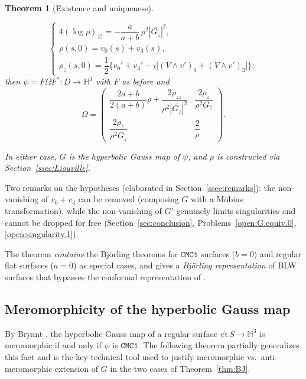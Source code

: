 \documentclass[11pt,a4paper]{article}
\newcommand{\Hyp}{\mathbb{H}^3}                      %
\theoremstyle{plain}
\newtheorem{theorem}{Theorem}
\theoremstyle{definition}
\theoremstyle{remark}
\begin{document}
\begin{theorem}[Existence and uniqueness]
\begin{description}
\begin{equation}
    \begin{cases}
      4(\log\rho)_{z\bar z} = -\dfrac a{a+b}\,\rho^2|\overline{G_z}|^2,\\[1mm]
      \rho(s,0) = v_0(s)+v_3(s),\\[1mm]
      \rho_z(s,0) = \dfrac12\Big\{v_0'+v_3'
        - i\big[(V\wedge v')_0+(V\wedge v')_3\big]\Big\};
    \end{cases}
  \end{equation}
  then $\psi=F\Omega F^*:D\to\Hyp$ with $F$ as before and
  \begin{equation}\label{eq:FOmega2}
    \Omega = \begin{pmatrix}
      \dfrac{2a+b}{2(a+b)}\rho + \dfrac{2\rho_{z\bar z}}{\rho^2|\overline{G_z}|^2}
        & \dfrac{2\rho_{\bar z}}{\rho^2 G_{\bar z}}\\[3mm]
      \dfrac{2\rho_z}{\rho^2\overline{G_z}} & \dfrac2\rho
    \end{pmatrix}.
  \end{equation}
\end{description}
In either case, $G$ is the hyperbolic Gauss map of $\psi$, and $\rho$ is
constructed via Section~\ref{ssec:Liouville}.
\end{theorem}

Two remarks on the hypotheses (elaborated in Section~\ref{ssec:remarks}):
the non-vanishing of $v_0+v_3$ can be removed (composing $G$ with a
Möbius transformation), while the non-vanishing of $G'$ genuinely limits
singularities and cannot be dropped for free (Section~\ref{sec:conclusion},
Problems~\ref{open:G.equiv.0}, \ref{open:singularity.1}).

The theorem \emph{contains} the Björling theorems for $\mathtt{CMC1}$
surfaces \cite{GMM1} ($b=0$) and regular flat surfaces \cite{GMM5}
($a=0$) as special cases, and gives a \emph{Björling representation} of
BLW surfaces that bypasses the conformal representation of \cite{GMM2}.

\subsection{Meromorphicity of the hyperbolic Gauss map}

By Bryant \cite{BRYANT}, the hyperbolic Gauss map of a regular surface
$\psi:S\to\Hyp$ is meromorphic if and only if $\psi$ is $\mathtt{CMC1}$.
The following theorem partially generalizes this fact and is the key
technical tool used to justify meromorphic vs.\ anti-meromorphic
extension of $G$ in the two cases of Theorem~\ref{thm:BJ}.
\end{document}

